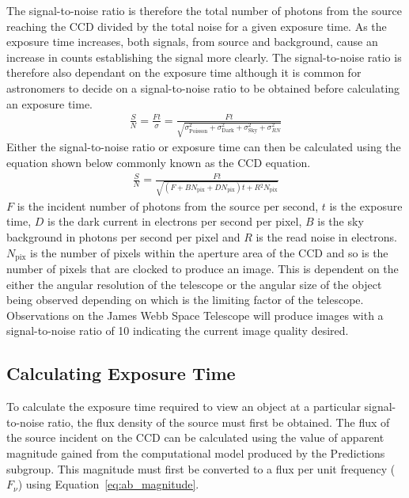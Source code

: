 			The signal-to-noise ratio is therefore the total number of photons from the source reaching the CCD divided by the total noise for a given exposure time. As the exposure time increases, both signals, from source and background, cause an increase in counts establishing the signal more clearly. The signal-to-noise ratio is therefore also dependant on the exposure time although it is common for astronomers to decide on a signal-to-noise ratio to be obtained before calculating an exposure time.
			\begin{align}
				\frac{S}{N} = \frac{Ft}{\sigma} =\frac{Ft}{\sqrt{\sigma_\text{Poisson}^{2} + \sigma_\text{Dark}^{2} + \sigma_\text{Sky}^{2} + \sigma_{RN}^{2}}}
			\end{align}
			Either the signal-to-noise ratio or exposure time can then be calculated using the equation shown below commonly known as the CCD equation.
			\begin{align}
				\frac{S}{N} = \frac{Ft}{\sqrt{(F + BN_\text{pix} + DN_\text{pix})t + R{^2}N_\text{pix}}}
			\end{align}
			$F$ is the incident number of photons from the source per second, $t$ is the exposure time, $D$ is the dark current in electrons per second per pixel, $B$ is the sky background in photons per second per pixel and $R$ is the read noise in electrons. $N_\text{pix}$ is the number of pixels within the aperture area of the CCD and so is the number of pixels that are clocked to produce an image. This is dependent on the either the angular resolution of the telescope or the angular size of the object being observed depending on which is the limiting factor of the telescope. Observations on the James Webb Space Telescope will produce images with a signal-to-noise ratio of 10 indicating the current image quality desired.

	\subsection{Calculating Exposure Time} %
	\label{sub:calculating_exposure_time}
		To calculate the exposure time required to view an object at a particular signal-to-noise ratio, the flux density of the source must first be obtained. The flux of the source incident on the CCD can be calculated using the value of apparent magnitude gained from the computational model produced by the Predictions subgroup. This magnitude must first be converted to a flux per unit frequency ($F_\nu$) using Equation~\ref{eq:ab_magnitude}.

